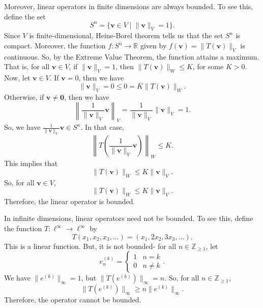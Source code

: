 \documentclass[a4paper, openany]{memoir}
\theoremstyle{definition}
\theoremstyle{plain}
\begin{document}
    Moreover, linear operators in finite dimensions are always bounded. To see this, define the set
    \[S^n = \{\bm{v} \in V \mid \lVert \bm{v} \rVert_V = 1\}.\]
    Since $V$ is finite-dimensional, Heine-Borel theorem tells us that the set $S^n$ is compact. Moreover, the function $f: S^n \to \mathbb{R}$ given by $f(\bm{v}) = \lVert T(\bm{v}) \rVert_V$ is continuous. So, by the Extreme Value Theorem, the function attains a maximum. That is, for all $\bm{v} \in V$, if $\lVert \bm{v} \rVert_V = 1$, then $\lVert T(\bm{v}) \rVert_W \leq K$, for some $K > 0$. Now, let $\bm{v} \in V$. If $\bm{v} = 0$, then we have 
    \[\lVert \bm{v} \rVert_V = 0 \leq 0 = K\lVert T(\bm{v}) \rVert_W.\]
    Otherwise, if $\bm{v} \neq \bm{0}$, then we have
    \[\left\lVert \frac{1}{\lVert \bm{v} \rVert_V} \bm{v} \right\rVert_V = \frac{1}{\lVert \bm{v} \rVert_V} \lVert \bm{v} \rVert_V = 1.\]
    So, we have $\frac{1}{\lVert \bm{v} \rVert_V} \bm{v} \in S^n$. In that case,
    \[\left\lVert T\left(\frac{1}{\lVert \bm{v} \rVert_V} \bm{v}\right) \right\rVert_W \leq K.\]
    This implies that
    \[\lVert T(\bm{v}) \rVert_W \leq K \lVert \bm{v} \rVert_V.\]
    So, for all $\bm{v} \in V$,
    \[\lVert T(\bm{v}) \rVert_W \leq K \lVert \bm{v} \rVert_V.\]
    Therefore, the linear operator is bounded.

    In infinite dimensions, linear operators need not be bounded. To see this, define the function $T: \ell^\infty \to \ell^\infty$ by
    \[T(x_1, x_2, x_3, \dots) = (x_1, 2x_2, 3x_3, \dots).\]
    This is a linear function. But, it is not bounded- for all $n \in \mathbb{Z}_{\geq 1}$, let
    \[e_n^{(k)} = \begin{cases}
        1 & n = k \\
        0 & n \neq k
    \end{cases}.\]
    We have $\lVert e^{(k)} \rVert_\infty = 1$, but $\lVert T(e^{(k)}) \rVert_\infty = n$. So, for all $n \in \mathbb{Z}_{\geq 1}$,
    \[\lVert T(e^{(k)}) \rVert_\infty \geq n \lVert e^{(k)} \rVert_\infty.\]
    Therefore, the operator cannot be bounded.
\end{document}
